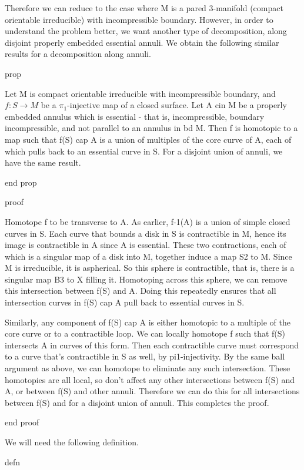 Therefore we can reduce to the case where M is a pared 3-manifold (compact
orientable irreducible) with incompressible boundary. However, in order to
understand the problem better, we want another type of decomposition, along
disjoint properly embedded essential annuli. We obtain the following similar
results for a decomposition along annuli.

prop

Let M is compact orientable irreducible with incompressible boundary, and $f
\colon S \to M$ be a $\pi_1$-injective map of a closed surface. Let A cin M be
a properly embedded annulus which is essential - that is, incompressible,
boundary incompressible, and not parallel to an annulus in bd M. Then f is
homotopic to a map such that f(S) cap A is a union of multiples of the core
curve of A, each of which pulls back to an essential curve in S. For a disjoint
union of annuli, we have the same result.

end prop

proof

Homotope f to be transverse to A. As earlier, f-1(A) is a union of simple
closed curves in S. Each curve that bounds a disk in S is contractible in M,
hence its image is contractible in A since A is essential. These two
contractions, each of which is a singular map of a disk into M, together induce
a map S2 to M. Since M is irreducible, it is aspherical. So this sphere is
contractible, that is, there is a singular map B3 to X filling it. Homotoping
across this sphere, we can remove this intersection between f(S) and A. Doing
this repeatedly ensures that all intersection curves in f(S) cap A pull back to
essential curves in S.

Similarly, any component of f(S) cap A is either homotopic to a multiple of the
core curve or to a contractible loop. We can locally homotope f such that f(S)
intersects A in curves of this form. Then each contractible curve must
correspond to a curve that's contractible in S as well, by pi1-injectivity. By
the same ball argument as above, we can homotope to eliminate any such
intersection. These homotopies are all local, so don't affect any other
intersections between f(S) and A, or between f(S) and other annuli. Therefore
we can do this for all intersections between f(S) and for a disjoint union of
annuli. This completes the proof.

end proof


We will need the following definition.

defn

